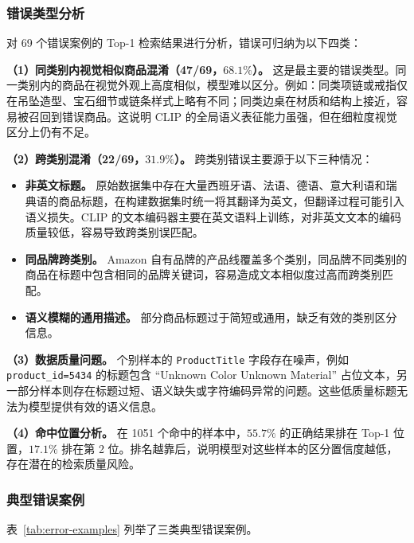 \documentclass[11pt, a4paper]{ctexart}
\begin{document}
\subsubsection*{错误类型分析}

对 69 个错误案例的 Top-1 检索结果进行分析，错误可归纳为以下四类：

\textbf{（1）同类别内视觉相似商品混淆（47/69，$68.1\%$）。} 这是最主要的错误类型。同一类别内的商品在视觉外观上高度相似，模型难以区分。例如：同类项链或戒指仅在吊坠造型、宝石细节或链条样式上略有不同；同类边桌在材质和结构上接近，容易被召回到错误商品。这说明 CLIP 的全局语义表征能力虽强，但在细粒度视觉区分上仍有不足。

\textbf{（2）跨类别混淆（22/69，$31.9\%$）。} 跨类别错误主要源于以下三种情况：
\begin{itemize}[leftmargin=2em, itemsep=0pt]
    \item \textbf{非英文标题。} 原始数据集中存在大量西班牙语、法语、德语、意大利语和瑞典语的商品标题，在构建数据集时统一将其翻译为英文，但翻译过程可能引入语义损失。CLIP 的文本编码器主要在英文语料上训练，对非英文文本的编码质量较低，容易导致跨类别误匹配。
    \item \textbf{同品牌跨类别。} Amazon 自有品牌的产品线覆盖多个类别，同品牌不同类别的商品在标题中包含相同的品牌关键词，容易造成文本相似度过高而跨类别匹配。
    \item \textbf{语义模糊的通用描述。} 部分商品标题过于简短或通用，缺乏有效的类别区分信息。
\end{itemize}

\textbf{（3）数据质量问题。} 个别样本的 \texttt{ProductTitle} 字段存在噪声，例如 \texttt{product\_id=5434} 的标题包含 ``Unknown Color Unknown Material'' 占位文本，另一部分样本则存在标题过短、语义缺失或字符编码异常的问题。这些低质量标题无法为模型提供有效的语义信息。

\textbf{（4）命中位置分析。} 在 1051 个命中的样本中，$55.7\%$ 的正确结果排在 Top-1 位置，$17.1\%$ 排在第 2 位。排名越靠后，说明模型对这些样本的区分置信度越低，存在潜在的检索质量风险。

\subsubsection*{典型错误案例}

表~\ref{tab:error-examples} 列举了三类典型错误案例。
\end{document}
